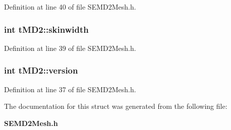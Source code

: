 Definition at line 40 of file S\+E\+M\+D2\+Mesh.\+h.

\subsubsection[{skinwidth}]{\setlength{\rightskip}{0pt plus 5cm}int t\+M\+D2\+::skinwidth}\label{structt_m_d2_a3779d3cddc7e9ef08b0534621197efaa}


Definition at line 39 of file S\+E\+M\+D2\+Mesh.\+h.

\subsubsection[{version}]{\setlength{\rightskip}{0pt plus 5cm}int t\+M\+D2\+::version}\label{structt_m_d2_a0f3bc21bc79be8d8e57bdb7d977965db}


Definition at line 37 of file S\+E\+M\+D2\+Mesh.\+h.



The documentation for this struct was generated from the following file\+:\begin{DoxyCompactItemize}
\item 
{\bf S\+E\+M\+D2\+Mesh.\+h}\end{DoxyCompactItemize}
